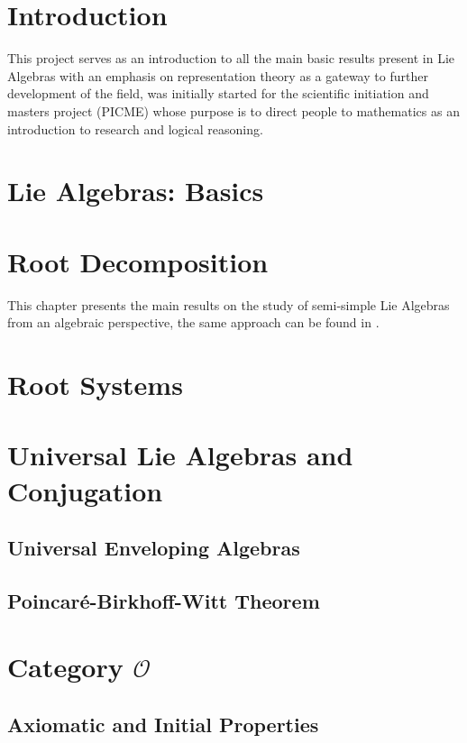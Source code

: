 \documentclass[svgnames,12pt,oneside, openright,a4paper]{scrbook}
\newcommand{\bggO}{\mathcal{O}}
\begin{document}

 \tableofcontents
\chapter*{Introduction}
This project serves as an introduction to all the main basic results present in Lie Algebras with an emphasis on representation theory as a gateway to further development of the field, was initially started for the scientific initiation and masters project (PICME) whose purpose is to direct people to mathematics as an introduction to research and logical reasoning.
\chapter{Lie Algebras: Basics}






\chapter{Root Decomposition}
This chapter presents the main results on the study of semi-simple Lie Algebras from an algebraic perspective, the same approach can be found in \cite{humphreys1}.




\chapter{Root Systems}



\chapter{Universal Lie Algebras and Conjugation}

\section{Universal Enveloping Algebras}
\section{Poincaré-Birkhoff-Witt Theorem}
\chapter{Category $\bggO$}
\section{Axiomatic and Initial Properties}
\end{document}
